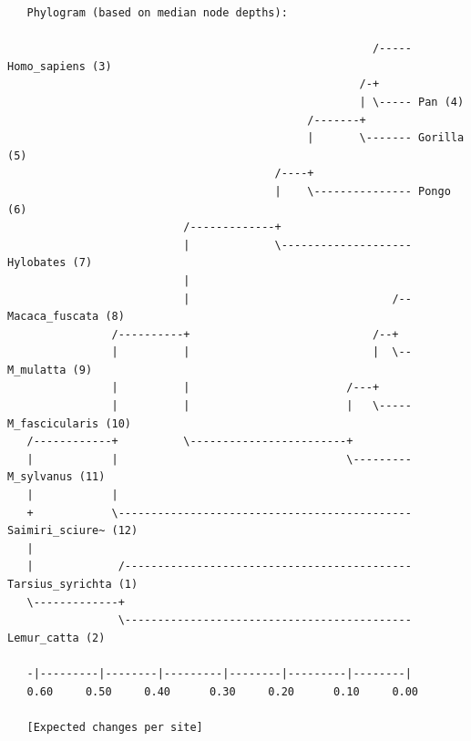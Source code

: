 \documentclass[12pt]{book}
\begin{document}
\begin{singlespacing}
\footnotesize
\begin{verbatim}
   Phylogram (based on median node depths):

                                                        /----- Homo_sapiens (3)
                                                      /-+                          
                                                      | \----- Pan (4)
                                              /-------+                            
                                              |       \------- Gorilla (5)
                                         /----+                                    
                                         |    \--------------- Pongo (6)
                           /-------------+                                         
                           |             \-------------------- Hylobates (7)
                           |                                                       
                           |                               /-- Macaca_fuscata (8)
                /----------+                            /--+                       
                |          |                            |  \-- M_mulatta (9)
                |          |                        /---+                          
                |          |                        |   \----- M_fascicularis (10)
   /------------+          \------------------------+                              
   |            |                                   \--------- M_sylvanus (11)
   |            |                                                                  
   +            \--------------------------------------------- Saimiri_sciure~ (12)
   |                                                                               
   |             /-------------------------------------------- Tarsius_syrichta (1)
   \-------------+                                                                 
                 \-------------------------------------------- Lemur_catta (2)
                                                                                   
   -|---------|--------|---------|--------|---------|--------|                     
   0.60     0.50     0.40      0.30     0.20      0.10     0.00                    

   [Expected changes per site]
\end{verbatim}
\normalsize
\end{singlespacing}
\end{document}
